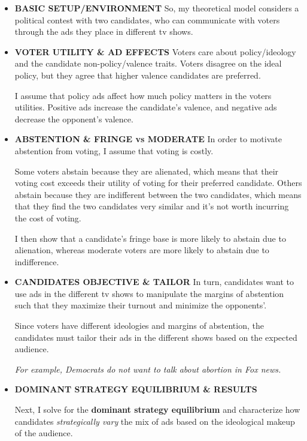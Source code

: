 \documentclass[12pt]{article}
\theoremstyle{plain}
\theoremstyle{plain}
\theoremstyle{plain}
\theoremstyle{plain}
\theoremstyle{plain}
\theoremstyle{plain}
\begin{document}
\begin{itemize}
\item \textbf{BASIC SETUP/ENVIRONMENT}
So, my theoretical model considers a political contest with two candidates,
who can communicate with voters through the ads they place in different tv shows.

\item \textbf{VOTER UTILITY \& AD EFFECTS}
Voters care about policy/ideology and the candidate non-policy/valence traits.
Voters disagree on the ideal policy, but they agree that higher valence candidates are preferred.

I assume that policy ads affect how much policy matters in the voters utilities.
Positive ads increase the candidate's valence, and negative ads decrease the opponent's valence.

\item \textbf{ABSTENTION \& FRINGE vs MODERATE}
In order to motivate abstention from voting, I assume that voting is costly.

Some voters abstain because they are alienated, which means that their voting cost exceeds their utility of voting for their preferred candidate.
Others abstain because they are indifferent between the two candidates, which means that they find the two candidates very similar and it's not worth incurring the cost of voting.

I then show that a candidate's fringe base is more likely to abstain due to alienation, whereas moderate voters are more likely to abstain due to indifference.

\item \textbf{CANDIDATES OBJECTIVE \& TAILOR}
In turn, candidates want to use ads in the different tv shows to manipulate the margins of abstention
such that they maximize their turnout and minimize the opponents'.

Since voters have different ideologies and margins of abstention,
the candidates must tailor their ads in the different shows based on the expected audience.

\emph{For example, Democrats do not want to talk about abortion in Fox news.}

\item \textbf{DOMINANT STRATEGY EQUILIBRIUM \& RESULTS}

Next, I solve for the \textbf{dominant strategy equilibrium} and characterize how candidates \emph{strategically vary} the mix of ads
based on the ideological makeup of the audience.


\end{itemize}
\end{document}
